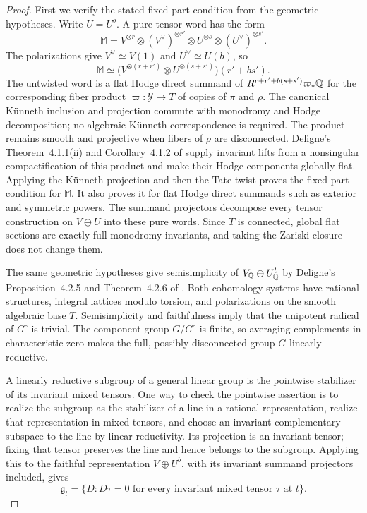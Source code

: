 \begin{proof}
First we verify the stated fixed-part condition from the geometric
hypotheses.  Write $U=U^b$.  A pure tensor word has the form
\[
 \mathbb M=
 V^{\otimes r}\otimes(V^\vee)^{\otimes r'}
 \otimes U^{\otimes s}\otimes(U^\vee)^{\otimes s'}.
\]
The polarizations give $V^\vee\simeq V(1)$ and
$U^\vee\simeq U(b)$, so
\[
 \mathbb M\simeq
 \bigl(V^{\otimes(r+r')}\otimes U^{\otimes(s+s')}\bigr)(r'+bs').
\]
The untwisted word is a flat Hodge direct summand of
$R^{r+r'+b(s+s')}\varpi_*\mathbb Q$ for the corresponding fiber product
$\varpi:\mathcal Y\to T$ of copies of $\pi$ and $\rho$.  The canonical K\"unneth
inclusion and projection commute with monodromy and Hodge
decomposition; no algebraic K\"unneth correspondence is required.
The product remains smooth and projective when fibers of $\rho$ are
disconnected.  Deligne's Theorem~4.1.1(ii) and Corollary~4.1.2 of
\cite{Deligne1971} supply invariant lifts from a nonsingular
compactification of this product and make their Hodge components
globally flat.  Applying the K\"unneth projection and then the Tate
twist proves the fixed-part condition for $\mathbb M$.
It also proves it for flat Hodge direct summands such as exterior
and symmetric powers.  The summand projectors decompose every tensor
construction on $V\oplus U$ into these pure words.  Since $T$ is
connected, global flat sections are exactly full-monodromy invariants,
and taking the Zariski closure does not change them.

The same geometric hypotheses give semisimplicity of
$V_\mathbb Q\oplus U^b_\mathbb Q$ by Deligne's Proposition~4.2.5 and
Theorem~4.2.6 of \cite{Deligne1971}.  Both cohomology systems have
rational structures, integral lattices modulo torsion, and
polarizations on the smooth algebraic base $T$.  Semisimplicity and
faithfulness imply that the unipotent radical of $G^\circ$ is trivial.
The component group $G/G^\circ$ is finite, so averaging complements
in characteristic zero makes the full, possibly disconnected group
$G$ linearly reductive.

A linearly reductive subgroup of a general linear group is the pointwise
stabilizer of its invariant mixed tensors.  One way to check the
pointwise assertion is to realize the subgroup as the stabilizer of
a line in a rational representation, realize that representation in
mixed tensors, and choose an invariant complementary subspace to the
line by linear reductivity.  Its projection is an invariant tensor; fixing
that tensor preserves the line and hence belongs to the subgroup.
Applying this to the faithful representation $V\oplus U^b$, with its
invariant summand projectors included, gives
\begin{equation}
 \mathfrak g_t=\{D: D\tau=0\text{ for every invariant mixed tensor }
                                      \tau\text{ at }t\}.
 \label{var:tensor-annihilator}
\end{equation}


\end{proof}
